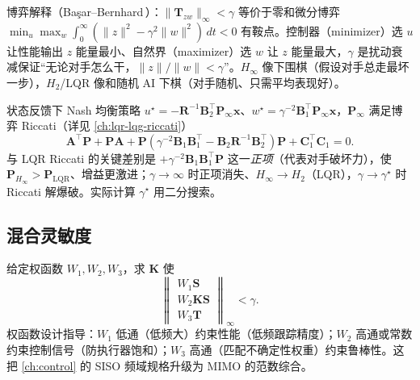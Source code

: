 \begin{insight}
博弈解释（Başar--Bernhard\,\cite{basar1995dynamic}）：$\|\mathbf T_{zw}\|_\infty<\gamma$ 等价于零和微分博弈 $\min_u\max_w\int_0^\infty(\|z\|^2-\gamma^2\|w\|^2)\,dt<0$ 有鞍点。控制器（minimizer）选 $u$ 让性能输出 $z$ 能量最小、自然界（maximizer）选 $w$ 让 $z$ 能量最大，$\gamma$ 是扰动衰减保证“无论对手怎么干，$\|z\|/\|w\|<\gamma$”。$H_\infty$ 像下围棋（假设对手总走最坏一步），$H_2$/LQR 像和随机 AI 下棋（对手随机、只需平均表现好）。
\end{insight}

状态反馈下 Nash 均衡策略 $u^\star=-\mathbf R^{-1}\mathbf B_2^\top\mathbf P_\infty\mathbf x$、$w^\star=\gamma^{-2}\mathbf B_1^\top\mathbf P_\infty\mathbf x$，$\mathbf P_\infty$ 满足博弈 Riccati（详见 \cref{ch:lqr-lqg-riccati}）
\begin{equation}
  \mathbf A^\top\mathbf P+\mathbf P\mathbf A+\mathbf P(\gamma^{-2}\mathbf B_1\mathbf B_1^\top-\mathbf B_2\mathbf R^{-1}\mathbf B_2^\top)\mathbf P+\mathbf C_1^\top\mathbf C_1=0.
  \label{eq:game-riccati}
\end{equation}
与 LQR Riccati 的关键差别是 $+\gamma^{-2}\mathbf B_1\mathbf B_1^\top\mathbf P$ 这一\emph{正项}（代表对手破坏力），使 $\mathbf P_{H_\infty}>\mathbf P_{\text{LQR}}$、增益更激进；$\gamma\to\infty$ 时正项消失、$H_\infty\to H_2$（LQR），$\gamma\to\gamma^\star$ 时 Riccati 解爆破。实际计算 $\gamma^\star$ 用二分搜索。

\subsection{混合灵敏度}
给定权函数 $W_1,W_2,W_3$，求 $\mathbf K$ 使
\begin{equation}
  \left\|\begin{matrix}W_1\mathbf S\\W_2\mathbf K\mathbf S\\W_3\mathbf T\end{matrix}\right\|_\infty<\gamma.
  \label{eq:mixed-sens}
\end{equation}
权函数设计指导：$W_1$ 低通（低频大）约束性能（低频跟踪精度）；$W_2$ 高通或常数约束控制信号（防执行器饱和）；$W_3$ 高通（匹配不确定性权重）约束鲁棒性。这把 \cref{ch:control} 的 SISO 频域规格升级为 MIMO 的范数综合。

